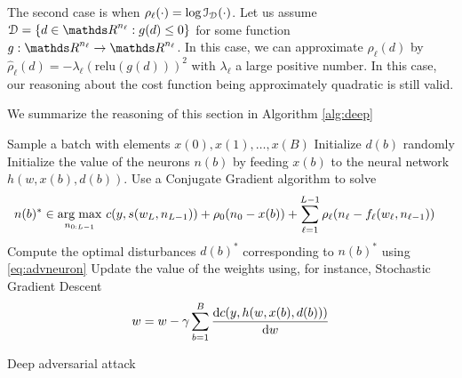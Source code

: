 \documentclass[11pt,letterpaper,DIV=17]{scrartcl}
\renewcommand{\l}[1][]{_{\ell#1}}
\renewcommand{\L}[1][]{_{L#1}}
\newcommand{\s}{s\qty}
\renewcommand{\c}{c\qty}
\newcommand{\f}{f\l\qty}
\begin{document}
The second case is when $\rho\l(\cdot)=\log\Ical_{\Dcal}(\cdot)$. Let us assume $\Dcal=\{d\in \eR^{n_\ell}: g(d)\le0\}$ for some function $g:\eR^{n_\ell}\to\eR^{n_\ell}$. In this case, we can approximate $\rho_\ell(d)$ by $\hat \rho\l(d)=-\lambda_\ell(\text{relu}(g(d)))^2$ with $\lambda_\ell$ a large positive number. In this case, our reasoning about the cost function being approximately quadratic is still valid.

We summarize the reasoning of this section in Algorithm \ref{alg:deep}

\begin{algorithm}[H]
	\begin{algorithmic}[1]
			\State Sample a batch with elements $x(0),x(1),\dots,x(B)$
					\State Initialize $d(b)$ randomly
					\State Initialize the value of the neurons $n(b)$ by feeding $x(b)$ to the neural network $h(w,x(b),d(b))$.
					\State Use a Conjugate Gradient algorithm to solve 
					\begin{equation*} 
					\begin{split}
					n(b)^*\in\argmax_{n_{0:L-1}}&\ \c(y,\s(w\L,n\L[-1]))+\rho_{0}(n_0-x(b))+\sum_{\ell=1}^{L-1}\rho\l(n\l-\f(w\l,n\l[-1]))
					\end{split}
					\end{equation*}
					\State Compute the optimal disturbances $d(b)^*$ corresponding to $n(b)^*$ using \eqref{eq:advneuron}
					\EndFor
				\State Update the value of the weights using, for instance, Stochastic Gradient Descent
				\begin{equation*}
				w=w-\gamma \sum_{b=1}^B\derivative{ \c(y,h(w,x(b),d(b)))}{w}
				\end{equation*}
				\EndFor			
			\EndFor

	\end{algorithmic}
	\caption{Deep adversarial attack}
	\label{alg:deep}
\end{algorithm}
\end{document}
